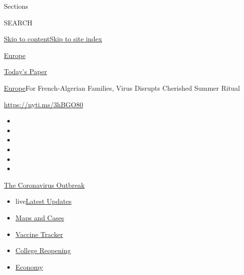 Sections

SEARCH

\protect\hyperlink{site-content}{Skip to
content}\protect\hyperlink{site-index}{Skip to site index}

\href{https://www.nytimes3xbfgragh.onion/section/world/europe}{Europe}

\href{https://myaccount.nytimes3xbfgragh.onion/auth/login?response_type=cookie\&client_id=vi}{}

\href{https://www.nytimes3xbfgragh.onion/section/todayspaper}{Today's
Paper}

\href{/section/world/europe}{Europe}\textbar{}For French-Algerian
Families, Virus Disrupts Cherished Summer Ritual

\url{https://nyti.ms/3hBGO80}

\begin{itemize}
\item
\item
\item
\item
\item
\item
\end{itemize}

\href{https://www.nytimes3xbfgragh.onion/news-event/coronavirus?action=click\&pgtype=Article\&state=default\&region=TOP_BANNER\&context=storylines_menu}{The
Coronavirus Outbreak}

\begin{itemize}
\tightlist
\item
  live\href{https://www.nytimes3xbfgragh.onion/2020/08/04/world/coronavirus-cases.html?action=click\&pgtype=Article\&state=default\&region=TOP_BANNER\&context=storylines_menu}{Latest
  Updates}
\item
  \href{https://www.nytimes3xbfgragh.onion/interactive/2020/us/coronavirus-us-cases.html?action=click\&pgtype=Article\&state=default\&region=TOP_BANNER\&context=storylines_menu}{Maps
  and Cases}
\item
  \href{https://www.nytimes3xbfgragh.onion/interactive/2020/science/coronavirus-vaccine-tracker.html?action=click\&pgtype=Article\&state=default\&region=TOP_BANNER\&context=storylines_menu}{Vaccine
  Tracker}
\item
  \href{https://www.nytimes3xbfgragh.onion/2020/08/02/us/covid-college-reopening.html?action=click\&pgtype=Article\&state=default\&region=TOP_BANNER\&context=storylines_menu}{College
  Reopening}
\item
  \href{https://www.nytimes3xbfgragh.onion/live/2020/08/04/business/stock-market-today-coronavirus?action=click\&pgtype=Article\&state=default\&region=TOP_BANNER\&context=storylines_menu}{Economy}
\end{itemize}

